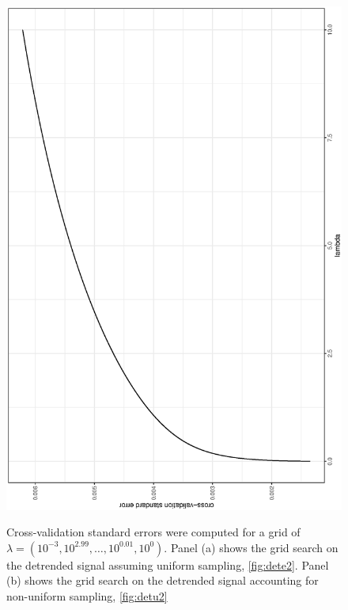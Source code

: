 \documentclass[twocolumn]{bmcart}%
\begin{document}
\begin{figure}[]
\begin{center}
{{    				\includegraphics[angle=270, width=\linewidth]{scv_ue2}
        		        }
		}\\ 	%

     \end{center}
       	\caption{ 
	Cross-validation standard errors were computed for a grid of $\lambda = (10^{-3}, 10^{2.99}, \dots ,10^{0.01}, 10^0)$. 
	Panel (a) shows the grid search on the detrended signal assuming uniform sampling, \ref{fig:dete2}. 
	Panel (b) shows the grid search on the detrended signal accounting for non-uniform sampling, \ref{fig:detu2}}
     	  \label{fig:gridsearch}

\end{figure}
\end{document}
